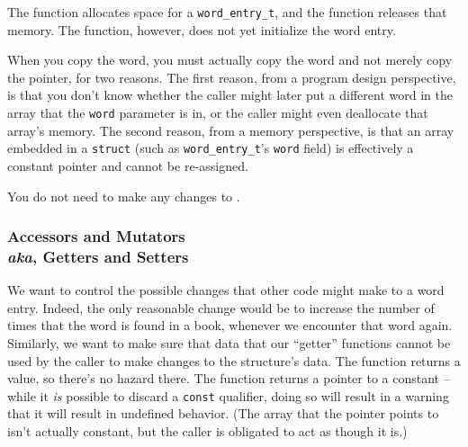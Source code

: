The  function allocates space for a \lstinline{word_entry_t}, and the  function releases that memory.
The  function, however, does not yet initialize the word entry.

\begin{description}
\end{description}

When you copy the word, you must actually copy the word and not merely copy the pointer, for two reasons.
The first reason, from a program design perspective, is that you don't know whether the caller might later put a different word in the array that the \lstinline{word} parameter is in, or the caller might even deallocate that array's memory.
The second reason, from a memory perspective, is that an array embedded in a \lstinline{struct} (such as \lstinline{word_entry_t}'s \lstinline{word} field) is effectively a constant pointer and cannot be re-assigned.

You do not need to make any changes to .

\subsubsection{Accessors and Mutators \\ \footnotesize{\textit{aka}, Getters and Setters}}

We want to control the possible changes that other code might make to a word entry.
Indeed, the only reasonable change would be to increase the number of times that the word is found in a book, whenever we encounter that word again.
Similarly, we want to make sure that data that our ``getter'' functions cannot be used by the caller to make changes to the structure's data.
The  function returns a value, so there's no hazard there.
The  function returns a pointer to a constant -- while it \textit{is} possible to discard a \lstinline{const} qualifier, doing so will result in a warning that it will result in undefined behavior.
(The array that the pointer points to isn't actually constant, but the caller is obligated to act as though it is.)

